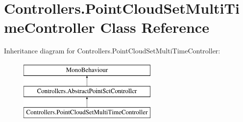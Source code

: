 \hypertarget{class_controllers_1_1_point_cloud_set_multi_time_controller}{}\section{Controllers.\+Point\+Cloud\+Set\+Multi\+Time\+Controller Class Reference}
\label{class_controllers_1_1_point_cloud_set_multi_time_controller}
Inheritance diagram for Controllers.\+Point\+Cloud\+Set\+Multi\+Time\+Controller\+:\begin{figure}[H]
\begin{center}
\leavevmode
\includegraphics[height=3.000000cm]{class_controllers_1_1_point_cloud_set_multi_time_controller}
\end{center}
\end{figure}
